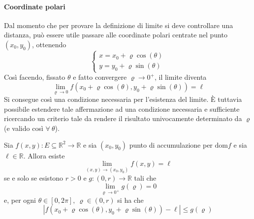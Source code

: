 \paragraph{Coordinate polari}
Dal momento che per provare la definizione di limite si deve controllare una distanza, può essere utile passare alle coordinate polari centrate nel punto $(x_0, y_0)$, ottenendo
\begin{equation}
    \begin{cases}
        x=x_0+ \varrho \cos(\theta)\\
        y=y_0+ \varrho \sin(\theta)
    \end{cases}
\end{equation}
Così facendo, fissato $\theta$ e fatto convergere $\varrho \to 0^+$, il limite diventa
\begin{equation}
    \lim_{\varrho\to 0}{f(x_0+\varrho\cos(\theta), y_0+\varrho\sin(\theta))}=\ell
\end{equation}
Si consegue così una condizione necessaria per l'esistenza del limite. È tuttavia possibile estendere tale affermazione ad una condizione necessaria e sufficiente ricercando un criterio tale da rendere il risultato univocamente determinato da $\varrho$ (e valido così $\forall\ \theta$).
\begin{theorem} \label{Teo: Condizione necessaria e sufficiente per un limite}
    Sia $f(x,y): E \subseteq \mathbb{R}^2 \to \mathbb{R}$ e sia $(x_0, y_0)$ punto di accumulazione per $\text{dom}f$ e sia $\ell \in \mathbb{R}$. Allora esiste
    \begin{equation}
        \lim_{(x,y)\to(x_0, y_0)}f(x,y)=\ell
    \end{equation}
    se e solo se esistono $r>0$ e $g:(0, r) \to \mathbb{R}$ tali che
    \begin{equation}
        \lim_{\varrho \to 0^+}{g(\varrho)=0}
    \end{equation}
    e, per ogni $\theta \in [0, 2\pi],\ \varrho\in (0, r)$ si ha che 
    \begin{equation}
        \left|f(x_0+\varrho\cos(\theta), y_0+\varrho\sin(\theta))-\ell \right|\leq g(\varrho)
    \end{equation}
\end{theorem}
